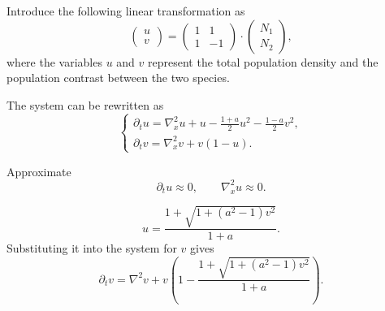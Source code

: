 \documentclass[aspectratio=169]{beamer}
\begin{document}
    \begin{frame}
        Introduce the following linear transformation as 
        \begin{equation}
            \begin{pmatrix}
                u\\
                v
            \end{pmatrix}
            = \begin{pmatrix}
                1 & 1 \\
                1 & -1
            \end{pmatrix}
            \cdot
            \begin{pmatrix}
                N_1\\
                N_2
            \end{pmatrix},
        \end{equation}
        where the variables $u$ and $v$ represent the total population density and the population contrast between the two species.

        The system can be rewritten as 
        \begin{equation}
            \label{eqn:symme_transform}
            \begin{cases}
                \partial_t u
                = \nabla_x^2 u
                + u
                - \frac{1+a}{2}u^2
                - \frac{1-a}{2}v^2,\\
                \partial_t v
                = \nabla_x^2 v + v(1-u).
            \end{cases}
        \end{equation}
    \end{frame}

    \begin{frame}
        Approximate
        \begin{equation*}
            \partial_t u \approx 0,
            \qquad
            \nabla_x^2 u \approx 0.
        \end{equation*}

        \begin{equation}\label{eqn:u_approx_solution}
            u = \frac{1 + \sqrt{1 + (a^2-1)v^2}}{1+a}.
        \end{equation}
        Substituting it into the system for $v$ gives
        \begin{equation}
            \partial_t v
            =
            \nabla^2 v
            +
            v
            \left(
                1
                -
                \frac{1+\sqrt{1+(a^2-1)v^2}}{1+a}
            \right).
        \end{equation}
    \end{frame}
\end{document}
